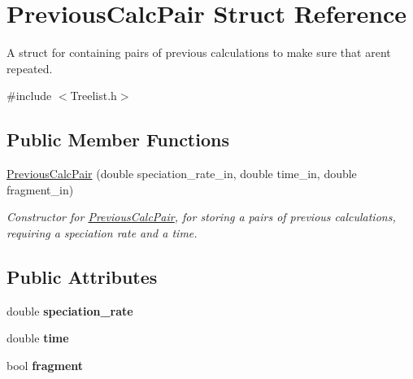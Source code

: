 \hypertarget{struct_previous_calc_pair}{}\section{Previous\+Calc\+Pair Struct Reference}
\label{struct_previous_calc_pair}


A struct for containing pairs of previous calculations to make sure that aren\textquotesingle{}t repeated.  




{\ttfamily \#include $<$Treelist.\+h$>$}

\subsection*{Public Member Functions}
\begin{DoxyCompactItemize}
\item 
\hyperlink{struct_previous_calc_pair_abf9ef9db746cb5c6187a5f2005082370}{Previous\+Calc\+Pair} (double speciation\+\_\+rate\+\_\+in, double time\+\_\+in, double fragment\+\_\+in)
\begin{DoxyCompactList}\small\item\em Constructor for \hyperlink{struct_previous_calc_pair}{Previous\+Calc\+Pair}, for storing a pairs of previous calculations, requiring a speciation rate and a time. \end{DoxyCompactList}\end{DoxyCompactItemize}
\subsection*{Public Attributes}
\begin{DoxyCompactItemize}
\item 
double {\bfseries speciation\+\_\+rate}\hypertarget{struct_previous_calc_pair_ab6c2d35a7aef763d80c96a9edba05df8}{}\label{struct_previous_calc_pair_ab6c2d35a7aef763d80c96a9edba05df8}

\item 
double {\bfseries time}\hypertarget{struct_previous_calc_pair_a4842282f698c0160b757bc3cc513c9bc}{}\label{struct_previous_calc_pair_a4842282f698c0160b757bc3cc513c9bc}

\item 
bool {\bfseries fragment}\hypertarget{struct_previous_calc_pair_a497aa4f0d1ab698f68f4f1275caae857}{}\label{struct_previous_calc_pair_a497aa4f0d1ab698f68f4f1275caae857}

\end{DoxyCompactItemize}


